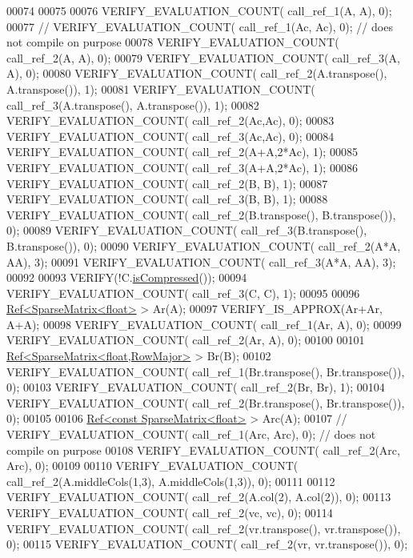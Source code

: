 \begin{DoxyCode}
00074   
00075 
00076   VERIFY\_EVALUATION\_COUNT( call\_ref\_1(A, A),  0);
00077 \textcolor{comment}{//   VERIFY\_EVALUATION\_COUNT( call\_ref\_1(Ac, Ac),  0); // does not compile on purpose}
00078   VERIFY\_EVALUATION\_COUNT( call\_ref\_2(A, A),  0);
00079   VERIFY\_EVALUATION\_COUNT( call\_ref\_3(A, A),  0);
00080   VERIFY\_EVALUATION\_COUNT( call\_ref\_2(A.transpose(), A.transpose()),  1);
00081   VERIFY\_EVALUATION\_COUNT( call\_ref\_3(A.transpose(), A.transpose()),  1);
00082   VERIFY\_EVALUATION\_COUNT( call\_ref\_2(Ac,Ac), 0);
00083   VERIFY\_EVALUATION\_COUNT( call\_ref\_3(Ac,Ac), 0);
00084   VERIFY\_EVALUATION\_COUNT( call\_ref\_2(A+A,2*Ac), 1);
00085   VERIFY\_EVALUATION\_COUNT( call\_ref\_3(A+A,2*Ac), 1);
00086   VERIFY\_EVALUATION\_COUNT( call\_ref\_2(B, B),  1);
00087   VERIFY\_EVALUATION\_COUNT( call\_ref\_3(B, B),  1);
00088   VERIFY\_EVALUATION\_COUNT( call\_ref\_2(B.transpose(), B.transpose()),  0);
00089   VERIFY\_EVALUATION\_COUNT( call\_ref\_3(B.transpose(), B.transpose()),  0);
00090   VERIFY\_EVALUATION\_COUNT( call\_ref\_2(A*A, AA),  3);
00091   VERIFY\_EVALUATION\_COUNT( call\_ref\_3(A*A, AA),  3);
00092   
00093   VERIFY(!C.\hyperlink{group___sparse_core___module_a837934b33a80fe996ff20500373d3a61}{isCompressed}());
00094   VERIFY\_EVALUATION\_COUNT( call\_ref\_3(C, C),  1);
00095   
00096   \hyperlink{group___core___module_class_eigen_1_1_ref}{Ref<SparseMatrix<float>} > Ar(A);
00097   VERIFY\_IS\_APPROX(Ar+Ar, A+A);
00098   VERIFY\_EVALUATION\_COUNT( call\_ref\_1(Ar, A),  0);
00099   VERIFY\_EVALUATION\_COUNT( call\_ref\_2(Ar, A),  0);
00100   
00101   \hyperlink{group___core___module_class_eigen_1_1_ref}{Ref<SparseMatrix<float,RowMajor>} > Br(B);
00102   VERIFY\_EVALUATION\_COUNT( call\_ref\_1(Br.transpose(), Br.transpose()),  0);
00103   VERIFY\_EVALUATION\_COUNT( call\_ref\_2(Br, Br),  1);
00104   VERIFY\_EVALUATION\_COUNT( call\_ref\_2(Br.transpose(), Br.transpose()),  0);
00105   
00106   \hyperlink{group___core___module_class_eigen_1_1_ref}{Ref<const SparseMatrix<float>} > Arc(A);
00107 \textcolor{comment}{//   VERIFY\_EVALUATION\_COUNT( call\_ref\_1(Arc, Arc),  0); // does not compile on purpose}
00108   VERIFY\_EVALUATION\_COUNT( call\_ref\_2(Arc, Arc),  0);
00109   
00110   VERIFY\_EVALUATION\_COUNT( call\_ref\_2(A.middleCols(1,3), A.middleCols(1,3)),  0);
00111   
00112   VERIFY\_EVALUATION\_COUNT( call\_ref\_2(A.col(2), A.col(2)),  0);
00113   VERIFY\_EVALUATION\_COUNT( call\_ref\_2(vc, vc),  0);
00114   VERIFY\_EVALUATION\_COUNT( call\_ref\_2(vr.transpose(), vr.transpose()),  0);
00115   VERIFY\_EVALUATION\_COUNT( call\_ref\_2(vr, vr.transpose()),  0);

\end{DoxyCode}
